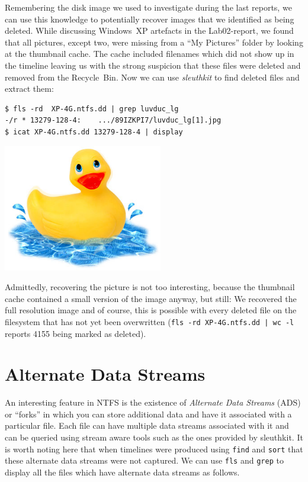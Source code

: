\documentclass[a4paper,
    11pt,
    normalheadings,
    parindent,
    UKenglish,
    abstracton,
    ]{scrartcl}
\begin{document}
Remembering the disk image we used to investigate during the last reports, we can use this knowledge to potentially recover images that we identified as being deleted.
While discussing Windows~XP artefacts in the Lab02-report, we found that all pictures, except two, were missing from a ``My Pictures'' folder by looking at the thumbnail cache.
The cache included filenames which did not show up in the timeline leaving us with the strong suspicion that these files were deleted and removed from the Recycle~Bin.
Now we can use \emph{sleuthkit} to find deleted files and extract them:
%
\begin{verbatim}
$ fls -rd  XP-4G.ntfs.dd | grep luvduc_lg
-/r * 13279-128-4:    .../89IZKPI7/luvduc_lg[1].jpg
$ icat XP-4G.ntfs.dd 13279-128-4 | display
\end{verbatim}
\begin{center}
\includegraphics[height=15em]{bin/lab03-luvduc_lg}
\end{center}

Admittedly, recovering the picture is not too interesting, because the thumbnail cache contained a small version of the image anyway, but still: We recovered the full resolution image and of course, this is possible with every deleted file on the filesystem that has not yet been overwritten (\texttt{fls -rd XP-4G.ntfs.dd | wc -l} reports 4155 being marked as deleted).



\section{Alternate Data Streams}
An interesting feature in NTFS is the existence of \emph{Alternate Data Streams} (ADS) or ``forks'' in which you can store additional data and have it associated with a particular file.
Each file can have multiple data streams associated with it and can be queried using stream aware tools such as the ones provided by sleuthkit.
It is worth noting here that when timelines were produced using \texttt{find} and \texttt{sort} that these alternate data streams were not captured.
We can use \texttt{fls} and \texttt{grep} to display all the files which have alternate data streams as follows.
\end{document}
